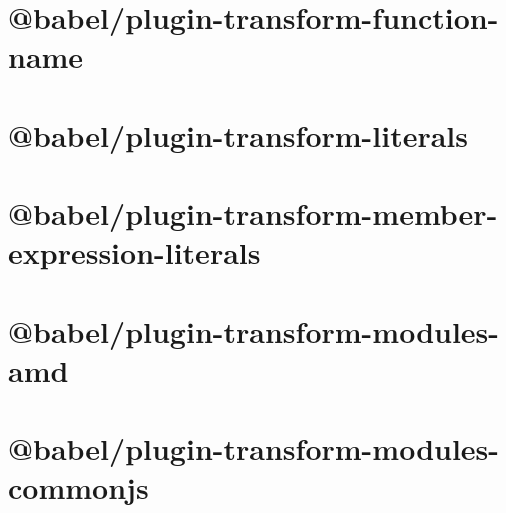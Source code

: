 \documentclass[twoside]{book}
\newcommand{\+}{\discretionary{\mbox{\scriptsize$\hookleftarrow$}}{}{}}
\begin{document}
\chapter{@babel/plugin-\/transform-\/function-\/name}
\label{md__c___users_vaishnavi_jadhav__desktop__developer_code_mean_stack_example_client_node_modules__b23ea38874ce5c98440a094a75db0b2c}

\chapter{@babel/plugin-\/transform-\/literals}
\label{md__c___users_vaishnavi_jadhav__desktop__developer_code_mean_stack_example_client_node_modules__2ce5d296c41efd1eba86751bffb92a82}

\chapter{@babel/plugin-\/transform-\/member-\/expression-\/literals}
\label{md__c___users_vaishnavi_jadhav__desktop__developer_code_mean_stack_example_client_node_modules__29506ad27eb0c75edb0fa9cfa4b61a81}

\chapter{@babel/plugin-\/transform-\/modules-\/amd}
\label{md__c___users_vaishnavi_jadhav__desktop__developer_code_mean_stack_example_client_node_modules__6a22a468e1a57f2939f6aade57292d91}

\chapter{@babel/plugin-\/transform-\/modules-\/commonjs}
\label{md__c___users_vaishnavi_jadhav__desktop__developer_code_mean_stack_example_client_node_modules__f29e3bc413d5b8a3d9a4f1cc9204b370}

\end{document}

